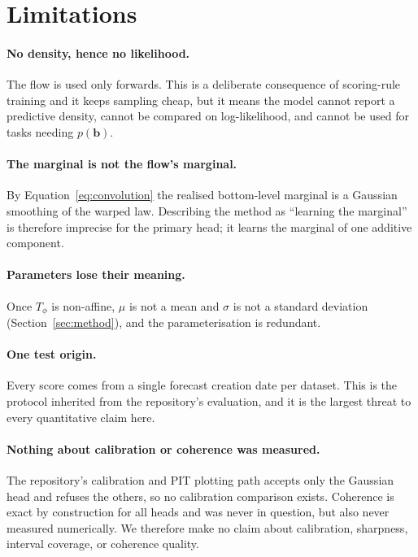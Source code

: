 \documentclass[11pt]{article}
\newcommand{\bvec}{\mathbf{b}}
\begin{document}
\section{Limitations}
\label{sec:limitations}

\paragraph{No density, hence no likelihood.} The flow is used only forwards. This is
a deliberate consequence of scoring-rule training and it keeps sampling cheap, but it
means the model cannot report a predictive density, cannot be compared on
log-likelihood, and cannot be used for tasks needing $p(\bvec)$.

\paragraph{The marginal is not the flow's marginal.} By
Equation~\eqref{eq:convolution} the realised bottom-level marginal is a Gaussian
smoothing of the warped law. Describing the method as ``learning the marginal'' is
therefore imprecise for the primary head; it learns the marginal of one additive
component.

\paragraph{Parameters lose their meaning.} Once $T_\phi$ is non-affine, $\mu$ is not
a mean and $\sigma$ is not a standard deviation
(Section~\ref{sec:method}), and the parameterisation is redundant.

\paragraph{One test origin.} Every score comes from a single forecast creation date
per dataset. This is the protocol inherited from the repository's evaluation, and it
is the largest threat to every quantitative claim here.

\paragraph{Nothing about calibration or coherence was measured.} The repository's
calibration and PIT plotting path accepts only the Gaussian head and refuses the
others, so no calibration comparison exists. Coherence is exact by construction for
all heads and was never in question, but also never measured numerically. We
therefore make no claim about calibration, sharpness, interval coverage, or
coherence quality.
\end{document}
